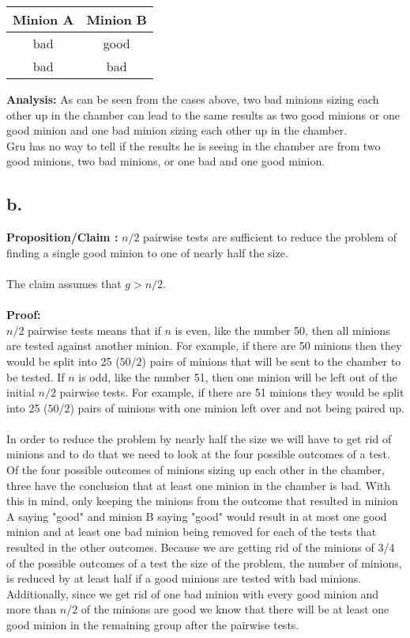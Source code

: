 \documentclass[12pt]{article}
\begin{document}
\begin{center}
\begin{tabular}{c|c}
Minion A & Minion B\\
\hline
bad & good\\
bad & bad\\
\end{tabular}
\end{center}

\noindent
\textbf{Analysis: }As can be seen from the cases above, two bad minions sizing each other up in the chamber 
can lead to the same results as two good minions or one good minion and one bad minion sizing each other up in the chamber.
\\
Gru has no way to tell if the results he is seeing in the chamber are from two good minions, two bad minions, or one bad and one good minion. 

\subsection*{b.}
\textbf{Proposition/Claim :} 
$n/2$ pairwise tests are sufficient to reduce the problem of finding a single good minion to one of nearly half the size.\\
\\
The claim assumes that $g > n/2$.\\
\\
\textbf{Proof: }\\
$n/2$ pairwise tests means that if $n$ is even, like the number 50, then all minions are tested against another minion.  For example, if there are 50 minions then they would be split into 25 ($50/2$) pairs of minions that will be sent to the chamber to be tested. 
If $n$ is odd, like the number 51, then one minion will be left out of the initial $n/2$ pairwise tests.  For example, if there are 51 minions they would be split into 25 ($50/2$) pairs of minions with one minion left over and not being paired up.\\
\\
In order to reduce the problem by nearly half the size we will have to get rid of minions and to do that we need to look at the four possible outcomes of a test.
Of the four possible outcomes of minions sizing up each other in the chamber, three have the conclusion that at least one minion in the chamber is bad.
With this in mind, only keeping the minions from the outcome that resulted in minion A saying "good" and minion B saying "good" would result in at most one good minion and at least one bad minion being removed for each of the tests that resulted in the other outcomes.
Because we are getting rid of the minions of 3/4 of the possible outcomes of a test the size of the problem, the number of minions, is reduced by at least half if a good minions are tested with bad minions.
Additionally, since we get rid of one bad minion with every good minion and more than $n/2$ of the minions are good we know that there will be at least one good minion in the remaining group after the pairwise tests.
\end{document}
